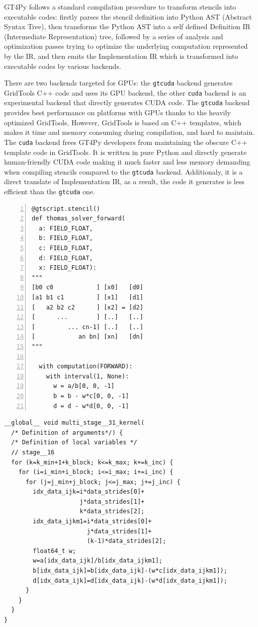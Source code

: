 \documentclass[]{article}
\begin{document}
GT4Py follows a standard compilation procedure to transform stencils into executable codes: firstly parses the stencil definition into Python AST (Abstract Syntax Tree), then transforms the Python AST into a self defined Definition IR (Intermediate Representation) tree, followed by a series of analysis and optimization passes trying to optimize the underlying computation represented by the IR, and then emits the Implementation IR which is transformed into executable codes by various backends.

There are two backends targeted for GPUs: the \texttt{gtcuda} backend generates GridTools C++ code and uses its GPU backend, the other \texttt{cuda} backend is an experimental backend that directly generates CUDA code. The \texttt{gtcuda} backend provides best performance on platforms with GPUs thanks to the heavily optimized GridTools. However, GridTools is based on C++ templates, which makes it time and memory consuming during compilation, and hard to maintain. The \texttt{cuda} backend frees GT4Py developers from maintaining the obscure C++ template code in GridTools. It is written in pure Python and directly generate human-friendly CUDA code making it much faster and less memory demanding when compiling stencils compared to the \texttt{gtcuda} backend. Additionaly, it is a direct translate of Implementation IR, as a result, the code it generates is less efficient than the \texttt{gtcuda} one.

\begin{minipage}{0.40\linewidth}
\begin{Verbatim}[frame=lines,numbers=left,label=Stencil Definition,framesep=3mm]
@gtscript.stencil()
def thomas_solver_forward(
  a: FIELD_FLOAT,
  b: FIELD_FLOAT,
  c: FIELD_FLOAT,
  d: FIELD_FLOAT,
  x: FIELD_FLOAT):
"""
[b0 c0            ] [x0]   [d0]
[a1 b1 c1         ] [x1]   [d1]
[   a2 b2 c2      ] [x2] = [d2]
[      ...        ] [..]   [..]
[         ... cn-1] [..]   [..]
[            an bn] [xn]   [dn]
"""

  with computation(FORWARD):
    with interval(1, None):
      w = a/b[0, 0, -1]
      b = b - w*c[0, 0, -1]
      d = d - w*d[0, 0, -1]
\end{Verbatim}
\end{minipage}\hfill
\begin{minipage}{0.60\linewidth}
\begin{Verbatim}[frame=lines,label=generated CUDA code,framesep=3mm]
__global__ void multi_stage__31_kernel(
  /* Definition of arguments*/) {
  /* Definition of local variables */
  // stage__16
  for (k=k_min+1+k_block; k<=k_max; k+=k_inc) {
    for (i=i_min+i_block; i<=i_max; i+=i_inc) {
      for (j=j_min+j_block; j<=j_max; j+=j_inc) {
        idx_data_ijk=i*data_strides[0]+
                     j*data_strides[1]+
                     k*data_strides[2];
        idx_data_ijkm1=i*data_strides[0]+
                       j*data_strides[1]+
                       (k-1)*data_strides[2];
        float64_t w;
        w=a[idx_data_ijk]/b[idx_data_ijkm1];
        b[idx_data_ijk]=b[idx_data_ijk]-(w*c[idx_data_ijkm1]);
        d[idx_data_ijk]=d[idx_data_ijk]-(w*d[idx_data_ijkm1]);
      }
    }
  }
}
\end{Verbatim}
\end{minipage}
\end{document}
